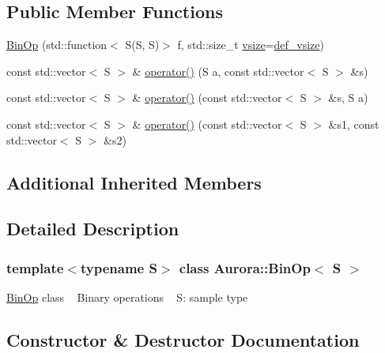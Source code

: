 \subsection*{Public Member Functions}
\begin{DoxyCompactItemize}
\item 
\hyperlink{class_aurora_1_1_bin_op_aa4d342b5e98bd21ba48d3c29500a9978}{Bin\+Op} (std\+::function$<$ S(S, S)$>$ f, std\+::size\+\_\+t \hyperlink{class_aurora_1_1_snd_base_af9e21aaf411b17f7a8221c991ce5d291}{vsize}=\hyperlink{namespace_aurora_afaaddf667a06e7ce23c667a8b7295263}{def\+\_\+vsize})
\item 
const std\+::vector$<$ S $>$ \& \hyperlink{class_aurora_1_1_bin_op_aef7a0a9a5daa40c22e540f08ca928fab}{operator()} (S a, const std\+::vector$<$ S $>$ \&s)
\item 
const std\+::vector$<$ S $>$ \& \hyperlink{class_aurora_1_1_bin_op_a488095df0eb9f16da6643476dec9e51c}{operator()} (const std\+::vector$<$ S $>$ \&s, S a)
\item 
const std\+::vector$<$ S $>$ \& \hyperlink{class_aurora_1_1_bin_op_abe8a0b7666caeda012d9ac18f889e116}{operator()} (const std\+::vector$<$ S $>$ \&s1, const std\+::vector$<$ S $>$ \&s2)
\end{DoxyCompactItemize}
\subsection*{Additional Inherited Members}


\subsection{Detailed Description}
\subsubsection*{template$<$typename S$>$\newline
class Aurora\+::\+Bin\+Op$<$ S $>$}

\hyperlink{class_aurora_1_1_bin_op}{Bin\+Op} class ~\newline
Binary operations ~\newline
S\+: sample type 

\subsection{Constructor \& Destructor Documentation}
\mbox{\label{class_aurora_1_1_bin_op_aa4d342b5e98bd21ba48d3c29500a9978}} 
